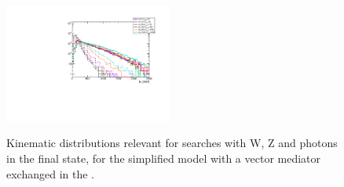 \begin{figure}[h!]
{	\includegraphics[width=0.49\textwidth]{figures/EW/monoWhad_Destructive/metPt}
}    
\caption{Kinematic distributions relevant for searches with W, Z and photons in the final state, 
for the simplified model
       with a vector mediator exchanged in the \schannel.}
\label{fig:DMV_EW_kinematics_SVMed}
\end{figure}
